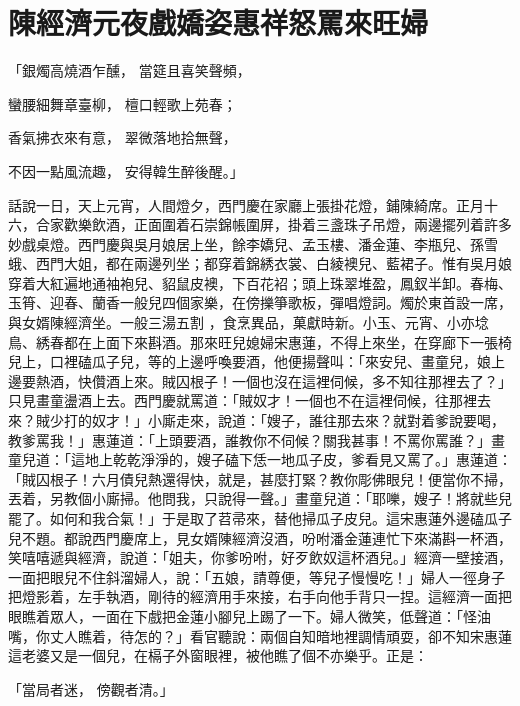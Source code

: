 %

\chapter{陳經濟元夜戲嬌姿\KG 惠祥怒罵來旺婦}

「銀燭高燒酒乍醺，  當筵且喜笑聲頻，

蠻腰細舞章臺柳，  檀口輕歌上苑春；

香氣拂衣來有意，  翠微落地拾無聲，

不因一點風流趣，  安得韓生醉後醒。」

話說一日，天上元宵，人間燈夕，西門慶在家廳上張掛花燈，鋪陳綺席。正月十六，合家歡樂飲酒，正面圍着石崇錦帳圍屏，掛着三盞珠子吊燈，兩邊擺列着許多妙戲桌燈。西門慶與吳月娘居上坐，餘李嬌兒、孟玉樓、潘金蓮、李瓶兒、孫雪蛾、西門大姐，都在兩邊列坐；都穿着錦綉衣裳、白綾襖兒、藍裙子。惟有吳月娘穿着大紅遍地通袖袍兒、貂鼠皮襖，下百花袑；頭上珠翠堆盈，鳳釵半卸。春梅、玉筲、迎春、蘭香一般兒四個家樂，在傍擽箏歌板，彈唱燈詞。燭於東首設一席，與女婿陳經濟坐。一般三湯五割 ，食烹異品，菓獻時新。小玉、元宵、小亦埝鳥、綉春都在上面下來斟酒。那來旺兒媳婦宋惠蓮，不得上來坐，在穿廊下一張椅兒上，口裡磕瓜子兒，等的上邊呼喚要酒，他便揚聲叫：「來安兒、畫童兒，娘上邊要熱酒，快儹酒上來。賊囚根子！一個也沒在這裡伺候，多不知往那裡去了？」只見畫童盪酒上去。西門慶就罵道：「賊奴才！一個也不在這裡伺候，往那裡去來？賊少打的奴才！」小廝走來，說道：「嫂子，誰往那去來？就對着爹說要喝，教爹罵我！」惠蓮道：「上頭要酒，誰教你不伺候？關我甚事！不罵你罵誰？」畫童兒道：「這地上乾乾淨淨的，嫂子磕下恁一地瓜子皮，爹看見又罵了。」惠蓮道：「賊囚根子！六月債兒熱還得快，就是，甚麼打緊？教你彫佛眼兒！便當你不掃，丟着，另教個小廝掃。他問我，只說得一聲。」畫童兒道：「耶嚛，嫂子！將就些兒罷了。如何和我合氣！」于是取了苕帚來，替他掃瓜子皮兒。這宋惠蓮外邊磕瓜子兒不題。都說西門慶席上，見女婿陳經濟沒酒，吩咐潘金蓮連忙下來滿斟一杯酒，笑嘻嘻遞與經濟，說道：「姐夫，你爹吩咐，好歹飲奴這杯酒兒。」經濟一壁接酒，一面把眼兒不住斜溜婦人，說：「五娘，請尊便，等兒子慢慢吃！」婦人一徑身子把燈影着，左手執酒，剛待的經濟用手來接，右手向他手背只一捏。這經濟一面把眼瞧着眾人，一面在下戲把金蓮小腳兒上踢了一下。婦人微笑，低聲道：「怪油嘴，你丈人瞧着，待怎的？」看官聽說：兩個自知暗地裡調情頑耍，卻不知宋惠蓮這老婆又是一個兒，在槅子外窗眼裡，被他瞧了個不亦樂乎。正是：

「當局者迷，  傍觀者清。」

